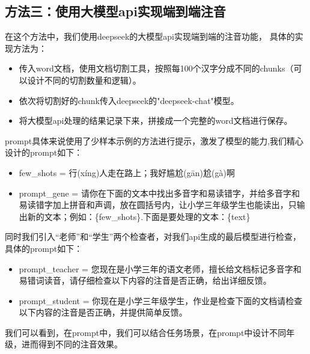 \documentclass[12pt,hyperref,a4paper,UTF8]{ctexart}
\begin{document}
\subsection{方法三：使用大模型api实现端到端注音}
在这个方法中，我们使用deepseek的大模型api实现端到端的注音功能，
具体的实现方法为：
\begin{itemize}
    \item 传入word文档，使用文档切割工具，按照每100个汉字分成不同的chunks（可以设计不同的切割数量和逻辑）。
    \item 依次将切割好的chunk传入deepseek的"deepseek-chat"模型。
    \item 将大模型api处理的结果记录下来，拼接成一个完整的word文档进行保存。
\end{itemize}
prompt具体来说使用了少样本示例的方法进行提示，激发了模型的能力,我们精心设计的prompt如下：
\begin{itemize}
    \item few\_shots = 行(xíng)人走在路上；我好尴尬(gān)尬(gà)啊
    \item prompt\_gene = 请你在下面的文本中找出多音字和易读错字，并给多音字和易读错字加上拼音和声调，放在圆括号内，让小学三年级学生也能读出，只输出新的文本；例如：\{few\_shots\}.下面是要处理的文本：\{text\}
\end{itemize}
同时我们引入“老师”和“学生”两个检查者，对我们api生成的最后模型进行检查，具体的prompt如下：
\begin{itemize}
    \item prompt\_teacher = 您现在是小学三年的语文老师，擅长给文档标记多音字和易错词读音，请仔细检查以下内容的注音是否正确，给出详细反馈。
    \item prompt\_student = 你现在是小学三年级学生，作业是检查下面的文档请检查以下内容的注音是否正确，并提供简单反馈。
\end{itemize}
我们可以看到，在prompt中，我们可以结合任务场景，在prompt中设计不同年级，进而得到不同的注音效果。
\end{document}
